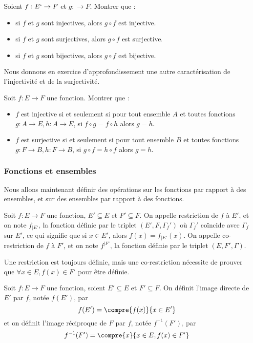 \begin{exo}
    Soient $f : E `\to F$ et $g : \to F$. Montrer que :
    \begin{itemize}
        \item si $f$ et $g$ sont injectives, alors $g\circ f$ est injective.
        \item si $f$ et $g$ sont surjectives, alors $g\circ f$ est surjective.
        \item si $f$ et $g$ sont bijectives, alors $g\circ f$ est bijective.
    \end{itemize}
\end{exo}

Nous donnons en exercice d'approfondissement une autre caractérisation de l'injectivité et de la surjectivité.

\begin{exo}[$\boldsymbol{*}$]
    Soit $f : E \to F$ une fonction. Montrer que :
    \begin{itemize}
        \item $f$ est injective si et seulement si pour tout ensemble $A$ et toutes fonctions $g : A \to E, h : A \to E$, si $f\circ g = f \circ h$ alors $g=h$.
        \item $f$ est surjective si et seulement si pour tout ensemble $B$ et toutes fonctions $g : F \to B, h : F \to B$, si $g\circ f = h \circ f$ alors $g=h$.
    \end{itemize}
\end{exo}

\subsubsection{Fonctions et ensembles}

Nous allons maintenant définir des opérations sur les fonctions par rapport à des ensembles, et sur des ensembles par rapport à des fonctions.

\begin{defi}
    Soit $f : E \to F$ une fonction, $E'\subseteq E$ et $F'\subseteq F$. On appelle restriction de $f$ à $E'$, et on note $f_{|E'}$, la fonction définie par le triplet $(E',F,\Gamma_f')$ où $\Gamma_f'$ coïncide avec $\Gamma_f$ sur $E'$, ce qui signifie que si $x\in E'$, alors $f(x)=f_{|E'}(x)$. On appelle co-restriction de $f$ à $F'$, et on note $f^{|F'}$, la fonction définie par le triplet $(E,F',\Gamma)$. 
    
    Une restriction est toujours définie, mais une co-restriction nécessite de prouver que $\forall x \in E, f(x)\in F'$ pour être définie.
\end{defi}

\begin{defi}
    Soit $f : E \to F$ une fonction, soient $E'\subseteq E$ et $F'\subseteq F$. On définit l'image directe de $E'$ par $f$, notée $f(E')$, par $$f(E')=\compre{f(x)}{x\in E'}$$ et on définit l'image réciproque de $F$ par $f$, notée $f^{-1}(F')$, par $$f^{-1}(F')=\compre{x}{x\in E, f(x)\in F'}$$
\end{defi}

\newpage